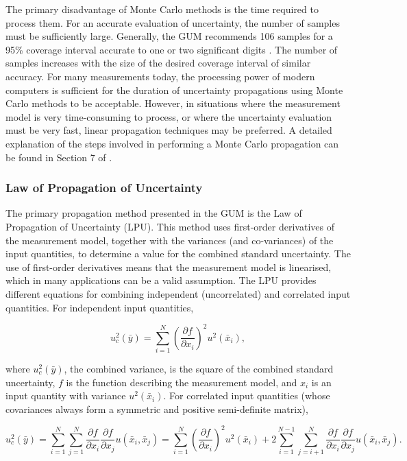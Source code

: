 \documentclass[../thesis/thesis.tex]{subfiles}
\begin{document}
\begin{refsection}
The primary disadvantage of Monte Carlo methods is the time required to process them. For an accurate evaluation of uncertainty, the number of samples must be sufficiently large. Generally, the GUM recommends 106 samples for a 95\% coverage interval accurate to one or two significant digits \cite[7.2.1]{GUM_S1}. The number of samples increases with the size of the desired coverage interval of similar accuracy. For many measurements today, the processing power of modern computers is sufficient for the duration of uncertainty propagations using Monte Carlo methods to be acceptable. However, in situations where the measurement model is very time-consuming to process, or where the uncertainty evaluation must be very fast, linear propagation techniques may be preferred. A detailed explanation of the steps involved in performing a Monte Carlo propagation can be found in Section 7 of \cite{GUM_S1}.

\subsubsection{Law of Propagation of Uncertainty}

The primary propagation method presented in the GUM is the Law of Propagation of Uncertainty (LPU). This method uses first-order derivatives of the measurement model, together with the variances (and co-variances) of the input quantities, to determine a value for the combined standard uncertainty. The use of first-order derivatives means that the measurement model is linearised, which in many applications can be a valid assumption. The LPU provides different equations for combining independent (uncorrelated) and correlated input quantities. For independent input quantities,

\begin{equation}
u^2_c(\bar{y}) = \sum_{i=1}^{N}(\frac{\partial f}{\partial x_i})^2 u^2(\bar{x}_i),
\end{equation}

where $u^2_c(\bar{y})$, the combined variance, is the square of the combined standard uncertainty, $f$ is the function describing the measurement model, and $x_i$ is an input quantity with variance $u^2(\bar{x}_i)$. For correlated input quantities (whose covariances always form a symmetric and positive semi-definite matrix),

\begin{equation}
u^2_c(\bar{y}) = \sum_{i=1}^{N}\sum_{j=1}^{N} \frac{\partial f}{\partial x_i}\frac{\partial f}{\partial x_j} u(\bar{x}_i,\bar{x}_j) = \sum_{i=1}^{N}(\frac{\partial f}{\partial x_i})^2 u^2(\bar{x}_i) + 2\sum_{i=1}^{N-1}\sum_{j=i+1}^{N} \frac{\partial f}{\partial x_i}\frac{\partial f}{\partial x_j} u(\bar{x}_i,\bar{x}_j).
\label{ch3_eqn_lpu_corr}
\end{equation}


\end{refsection}
\end{document}
